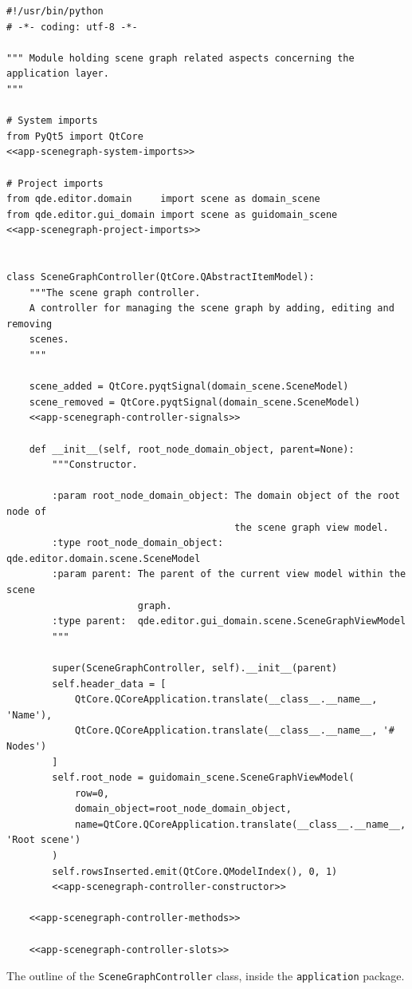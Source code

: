 \documentclass[10pt, openright, notitlepage]{scrreprt}
\begin{document}
\begin{listing}[H]
\begin{verbatim}
#!/usr/bin/python
# -*- coding: utf-8 -*-

""" Module holding scene graph related aspects concerning the application layer.
"""

# System imports
from PyQt5 import QtCore
<<app-scenegraph-system-imports>>

# Project imports
from qde.editor.domain     import scene as domain_scene
from qde.editor.gui_domain import scene as guidomain_scene
<<app-scenegraph-project-imports>>


class SceneGraphController(QtCore.QAbstractItemModel):
    """The scene graph controller.
    A controller for managing the scene graph by adding, editing and removing
    scenes.
    """

    scene_added = QtCore.pyqtSignal(domain_scene.SceneModel)
    scene_removed = QtCore.pyqtSignal(domain_scene.SceneModel)
    <<app-scenegraph-controller-signals>>

    def __init__(self, root_node_domain_object, parent=None):
        """Constructor.

        :param root_node_domain_object: The domain object of the root node of
                                        the scene graph view model.
        :type root_node_domain_object:  qde.editor.domain.scene.SceneModel
        :param parent: The parent of the current view model within the scene
                       graph.
        :type parent:  qde.editor.gui_domain.scene.SceneGraphViewModel
        """

        super(SceneGraphController, self).__init__(parent)
        self.header_data = [
            QtCore.QCoreApplication.translate(__class__.__name__, 'Name'),
            QtCore.QCoreApplication.translate(__class__.__name__, '# Nodes')
        ]
        self.root_node = guidomain_scene.SceneGraphViewModel(
            row=0,
            domain_object=root_node_domain_object,
            name=QtCore.QCoreApplication.translate(__class__.__name__, 'Root scene')
        )
        self.rowsInserted.emit(QtCore.QModelIndex(), 0, 1)
        <<app-scenegraph-controller-constructor>>

    <<app-scenegraph-controller-methods>>

    <<app-scenegraph-controller-slots>>
\end{verbatim}
\caption{\label{lst:app-scenegraph}
The outline of the \texttt{SceneGraphController} class, inside the \texttt{application} package.}
\end{listing}
\end{document}
